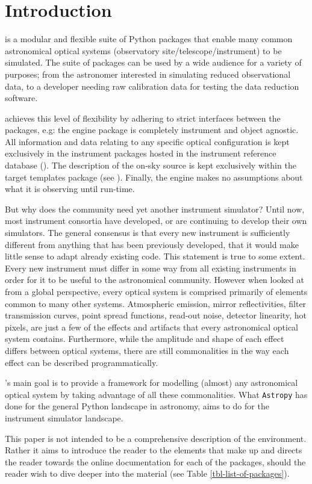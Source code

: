 \section{Introduction}
\label{introduction}

\ScopeSim{} is a modular and flexible suite of Python packages that enable many common astronomical optical systems (observatory site/telescope/instrument) to be simulated.
The suite of packages can be used by a wide audience for a variety of purposes; from the astronomer interested in simulating reduced observational data, to a developer needing raw calibration data for testing the data reduction software.

\ScopeSim{} achieves this level of flexibility by adhering to strict interfaces between the packages, e.g: the \ScopeSim{} engine package is completely instrument and object agnostic.
All information and data relating to any specific optical configuration is kept exclusively in the instrument packages hosted in the instrument reference database (\IRDB{}).
The description of the on-sky source is kept exclusively within the target templates package (see \ScopeSimtemplates{}).
Finally, the engine makes no assumptions about what it is observing until run-time.

But why does the community need yet another instrument simulator?
Until now, most instrument consortia have developed, or are continuing to develop their own simulators\cite{hsim, schmalzl2012, simcado2016, simcado2019}.
The general consensus is that every new instrument is sufficiently different from anything that has been previously developed, that it would make little sense to adapt already existing code.
This statement is true to some extent.
Every new instrument must differ in some way from all existing instruments in order for it to be useful to the astronomical community.
However when looked at from a global perspective, every optical system is comprised primarily of elements common to many other systems.
Atmospheric emission, mirror reflectivities, filter transmission curves, point spread functions, read-out noise, detector linearity, hot pixels, are just a few of the effects and artifacts that every astronomical optical system contains.
Furthermore, while the amplitude and shape of each effect differs between optical systems, there are still commonalities in the way each effect can be described programmatically.

\ScopeSim{}'s main goal is to provide a framework for modelling (almost) any astronomical optical system by taking advantage of all these commonalities.
What \lstinline{Astropy} has done for the general Python landscape in astronomy, \ScopeSim{} aims to do for the instrument simulator landscape.

This paper is not intended to be a comprehensive description of the \ScopeSim{} environment.
Rather it aims to introduce the reader to the elements that make up \ScopeSim{} and directs the reader towards the online documentation for each of the packages, should the reader wish to dive deeper into the material (see Table \ref{tbl-list-of-packages}).
